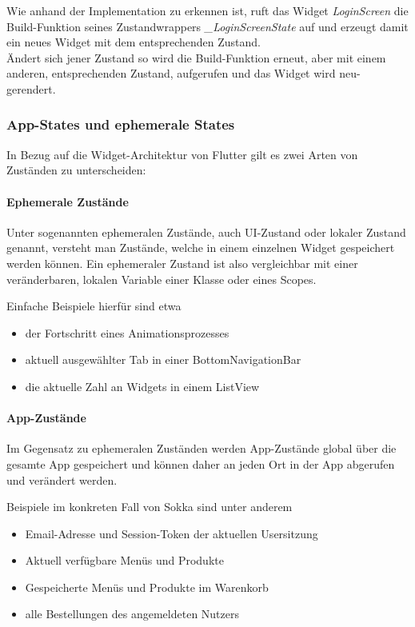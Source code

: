 Wie anhand der Implementation zu erkennen ist, ruft das Widget \textit{LoginScreen} die Build-Funktion
seines Zustandwrappers \textit{\_LoginScreenState} auf und erzeugt damit ein neues Widget mit dem entsprechenden
Zustand.\\
Ändert sich jener Zustand so wird die Build-Funktion erneut, aber mit einem anderen, entsprechenden Zustand,
aufgerufen und das Widget wird neu-gerendert.

\subsubsection{App-States und ephemerale States}


In Bezug auf die Widget-Architektur von Flutter gilt es zwei Arten von Zuständen zu unterscheiden:

\paragraph{Ephemerale Zustände}

Unter sogenannten ephemeralen Zustände, auch UI-Zustand oder lokaler Zustand genannt, versteht man Zustände, welche in
einem einzelnen Widget gespeichert werden können.
Ein ephemeraler Zustand ist also vergleichbar mit einer veränderbaren, lokalen Variable einer Klasse oder eines Scopes.

Einfache Beispiele hierfür sind etwa
\begin{itemize}
    \item der Fortschritt eines Animationsprozesses
    \item aktuell ausgewählter Tab in einer BottomNavigationBar
    \item die aktuelle Zahl an Widgets in einem ListView
\end{itemize}

\paragraph{App-Zustände}

Im Gegensatz zu ephemeralen Zuständen werden App-Zustände global über die gesamte App gespeichert und
können daher an jeden Ort in der App abgerufen und verändert werden.

Beispiele im konkreten Fall von Sokka sind unter anderem
\begin{itemize}
    \item Email-Adresse und Session-Token der aktuellen Usersitzung
    \item Aktuell verfügbare Menüs und Produkte
    \item Gespeicherte Menüs und Produkte im Warenkorb
    \item alle Bestellungen des angemeldeten Nutzers
\end{itemize}

